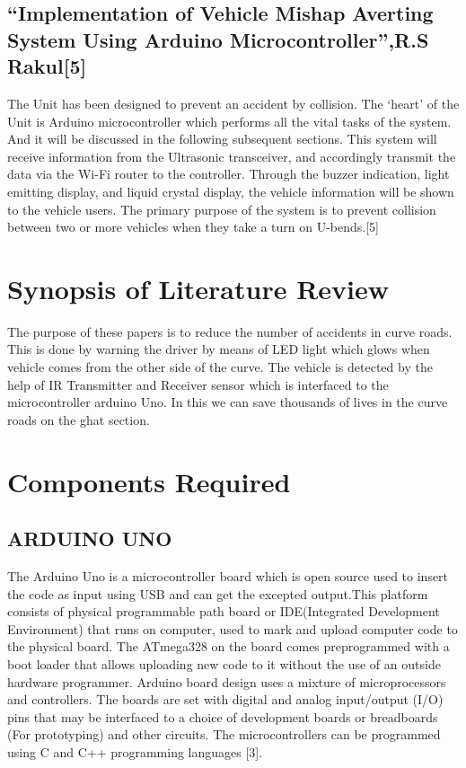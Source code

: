 \documentclass[conference]{IEEEtran}
\begin{document}
    \subsection{“Implementation of Vehicle Mishap Averting System Using Arduino Microcontroller”,R.S Rakul[5]}
    The Unit has been designed to prevent an accident by collision. The ‘heart' of the Unit is
    Arduino microcontroller which performs all the vital tasks of the system. And it will be discussed in the
    following subsequent sections. This system will receive information from the Ultrasonic transceiver, and
    accordingly transmit the data via the Wi-Fi router to the controller. Through the buzzer indication, light
    emitting display, and liquid crystal display, the vehicle information will be shown to the vehicle users. The
    primary purpose of the system is to prevent collision between two or more vehicles when they take a turn on
    U-bends.[5]

    \section{Synopsis of Literature Review}
    The purpose of these papers is to reduce the number of
    accidents in curve roads. This is done by warning the driver
    by means of LED light which glows when vehicle comes from
    the other side of the curve. The vehicle is detected by the
    help of IR Transmitter and Receiver sensor which is
    interfaced to the microcontroller arduino Uno. In this we can
    save thousands of lives in the curve roads on the ghat
    section.
    \section{Components Required}


    \subsection{ARDUINO UNO}\label{AA}
    The Arduino Uno is a microcontroller board which is open
    source used to insert the code as input using USB and can get
    the excepted output.This platform consists of physical
    programmable path board or IDE(Integrated Development
    Environment) that runs on computer, used to mark and
    upload computer code to the physical board. The
    ATmega328 on the board comes preprogrammed with a
    boot loader that allows uploading new code to it without the
    use of an outside hardware programmer. Arduino board
    design uses a mixture of microprocessors and controllers.
    The
    boards
    are
    set
    with
    digital
    and
    analog input/output (I/O) pins that may be interfaced to a
    choice of development boards or breadboards (For
    prototyping) and other circuits. The microcontrollers can be
    programmed using C and C++ programming languages [3].
\end{document}
